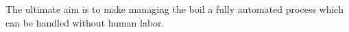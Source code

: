 The ultimate aim is to make managing the boil a fully automated process which can be handled without human labor.